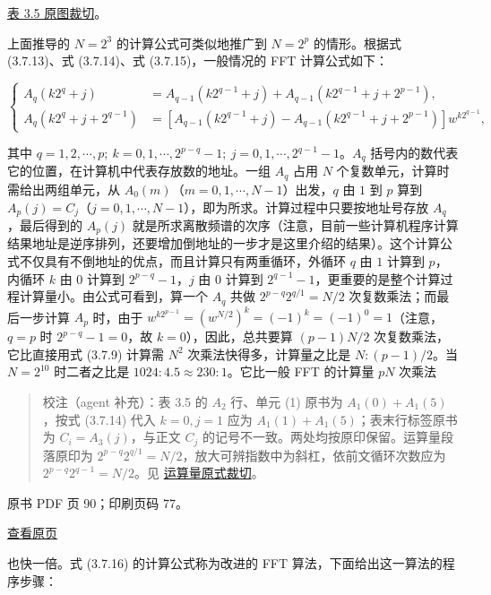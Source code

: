 \href{verified/assets/ch03b/table-3-5-source.png}{表 3.5 原图裁切}。

上面推导的 \(N=2^3\) 的计算公式可类似地推广到 \(N=2^p\) 的情形。根据式 (3.7.13)、式 (3.7.14)、式 (3.7.15)，一般情况的 FFT 计算公式如下：

\[
\left\{\begin{aligned}
A_q(k2^q+j)&=A_{q-1}(k2^{q-1}+j)+A_{q-1}(k2^{q-1}+j+2^{p-1}),\\
A_q(k2^q+j+2^{q-1})&=[A_{q-1}(k2^{q-1}+j)-A_{q-1}(k2^{q-1}+j+2^{p-1})]w^{k2^{q-1}},
\end{aligned}\right.\tag{3.7.16}
\]

其中 \(q=1,2,\cdots,p;\ k=0,1,\cdots,2^{p-q}-1;\ j=0,1,\cdots,2^{q-1}-1\)。\(A_q\) 括号内的数代表它的位置，在计算机中代表存放数的地址。一组 \(A_q\) 占用 \(N\) 个复数单元，计算时需给出两组单元，从 \(A_0(m)\)（\(m=0,1,\cdots,N-1\)）出发，\(q\) 由 \(1\) 到 \(p\) 算到 \(A_p(j)=C_j\)（\(j=0,1,\cdots,N-1\)），即为所求。计算过程中只要按地址号存放 \(A_q\)，最后得到的 \(A_p(j)\) 就是所求离散频谱的次序（注意，目前一些计算机程序计算结果地址是逆序排列，还要增加倒地址的一步才是这里介绍的结果）。这个计算公式不仅具有不倒地址的优点，而且计算只有两重循环，外循环 \(q\) 由 \(1\) 计算到 \(p\)，内循环 \(k\) 由 \(0\) 计算到 \(2^{p-q}-1\)，\(j\) 由 \(0\) 计算到 \(2^{q-1}-1\)，更重要的是整个计算过程计算量小。由公式可看到，算一个 \(A_q\) 共做 \(2^{p-q}2^{q/1}=N/2\) 次复数乘法；而最后一步计算 \(A_p\) 时，由于 \(w^{k2^{p-1}}=(w^{N/2})^k=(-1)^k=(-1)^0=1\)（注意，\(q=p\) 时 \(2^{p-q}-1=0\)，故 \(k=0\)），因此，总共要算 \((p-1)N/2\) 次复数乘法，它比直接用式 (3.7.9) 计算需 \(N^2\) 次乘法快得多，计算量之比是 \(N:(p-1)/2\)。当 \(N=2^{10}\) 时二者之比是 \(1024:4.5\approx230:1\)。它比一般 FFT 的计算量 \(pN\) 次乘法

\begin{quote}
校注（agent 补充）：表 3.5 的 \(A_2\) 行、单元 (1) 原书为 \(A_1(0)+A_1(5)\)，按式 (3.7.14) 代入 \(k=0,j=1\) 应为 \(A_1(1)+A_1(5)\)；表末行标签原书为 \(C_i=A_3(j)\)，与正文 \(C_j\) 的记号不一致。两处均按原印保留。运算量段落原印为 \(2^{p-q}2^{q/1}=N/2\)，放大可辨指数中为斜杠，依前文循环次数应为 \(2^{p-q}2^{q-1}=N/2\)。见 \href{verified/assets/ch03b/p089-operation-count.png}{运算量原式裁切}。
\end{quote}

\clearpage

原书 PDF 页 90；印刷页码 77。

\href{source-images/pdf-090.jpeg}{查看原页}

也快一倍。式 (3.7.16) 的计算公式称为改进的 FFT 算法，下面给出这一算法的程序步骤：

